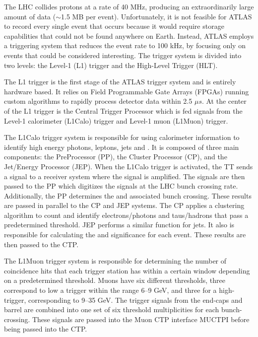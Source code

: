 The LHC collides protons at a rate of 40 MHz, producing an extraordinarily large amount of data ($\sim$1.5 MB per event). Unfortunately, it is not feasible for ATLAS to record every single event that occurs because it would require storage capabilities that could not be found anywhere on Earth. Instead, ATLAS employs a triggering system that reduces the event rate to 100 kHz, by focusing only on events that could be considered interesting\@. The trigger system is divided into two levels: the Level-1 (L1) trigger and the High-Level Trigger (HLT)\@.

The L1 trigger is the first stage of the ATLAS trigger system and is entirely hardware based. It relies on Field Programmable Gate Arrays (FPGAs) running custom algorithms to rapidly process detector data within 2.5 $\mu{}s$. At the center of the L1 trigger is the Central Trigger Processor which is fed signals from the Level-1 calorimeter (L1Calo) trigger and Level-1 muon (L1Muon) trigger.

The L1Calo trigger system is responsible for using calorimeter information to identify high energy photons, leptons, jets and \met{}. It is composed of three main components: the PreProcessor (PP), the Cluster Processor (CP), and the Jet/Energy Processor (JEP)\@. When the L1Calo trigger is activated, the TT sends a signal to a receiver system where the signal is amplified. The signals are then passed to the PP which digitizes the signals at the LHC bunch crossing rate. Additionally, the PP determines the \met{} and associated bunch crossing. These results are passed in parallel to the CP and JEP systems. The CP applies a clustering algorithm to count and identify electrons/photons and taus/hadrons that pass a predetermined threshold. JEP performs a similar function for jets. It also is responsible for calculating the \met{} and \met{} significance for each event. These results are then passed to the CTP\@. 

The L1Muon trigger system is responsible for determining the number of coincidence hits that each trigger station has within a certain window depending on a predetermined \pt{} threshold. Muons have six different thresholds, three correspond to low a \pt{} trigger within the range 6--9 GeV, and three for a high-\pt{} trigger, corresponding to 9--35 GeV. The trigger signals from the end-caps and barrel are combined into one set of six threshold multiplicities for each bunch-crossing. These signals are passed into the Muon CTP interface MUCTPI before being passed into the CTP\@.

